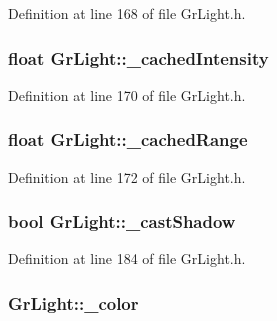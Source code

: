 Definition at line 168 of file GrLight.h.\hypertarget{class_gr_light_e8f05c795e23f3fdf3c19d741ca05249}{
\subsubsection[{\_\-cachedIntensity}]{\setlength{\rightskip}{0pt plus 5cm}float {\bf GrLight::\_\-cachedIntensity}}}
\label{class_gr_light_e8f05c795e23f3fdf3c19d741ca05249}




Definition at line 170 of file GrLight.h.\hypertarget{class_gr_light_1f981e227788c6ffdb67a784cfb5fc0a}{
\subsubsection[{\_\-cachedRange}]{\setlength{\rightskip}{0pt plus 5cm}float {\bf GrLight::\_\-cachedRange}}}
\label{class_gr_light_1f981e227788c6ffdb67a784cfb5fc0a}




Definition at line 172 of file GrLight.h.\hypertarget{class_gr_light_14d77a9c1e384353535a4a16f3f7b9a3}{
\subsubsection[{\_\-castShadow}]{\setlength{\rightskip}{0pt plus 5cm}bool {\bf GrLight::\_\-castShadow}}}
\label{class_gr_light_14d77a9c1e384353535a4a16f3f7b9a3}




Definition at line 184 of file GrLight.h.\hypertarget{class_gr_light_ba85bb3363501d63dfbd46adb583aaba}{
\subsubsection[{\_\-color}]{ {\bf GrLight::\_\-color}}}
\label{class_gr_light_ba85bb3363501d63dfbd46adb583aaba}




